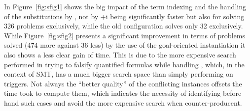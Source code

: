 \message{ !name(main.tex)}\documentclass{easychair}
\begin{document}
In Figure~\ref{fig:sfig1} shows the big impact of the term indexing
and the handling of the substitutions by {\ccfv}, not by {\verit}+i
being significantly faster but also for solving 326 problems
exclusively, while the old configuration solves only 32
exclusively. While Figure~\ref{fig:sfig2} presents a significant
improvement in terms of problems solved (474 more against 36 less) by
the use of the goal-oriented instantiation it also shows a less clear
gain of time. This is due to the more expensive search performed in
trying to falsify quantified formulas while handling {\euni}, which,
in the context of SMT, has a much bigger search space than simply
performing {\ematch} on triggers. Not always the ``better quality'' of
the conflicting instances offsets the time took to compute them, which
indicates the necessity of identifying before hand such cases and
avoid the more expensive search when counter-producent.


\end{document}
